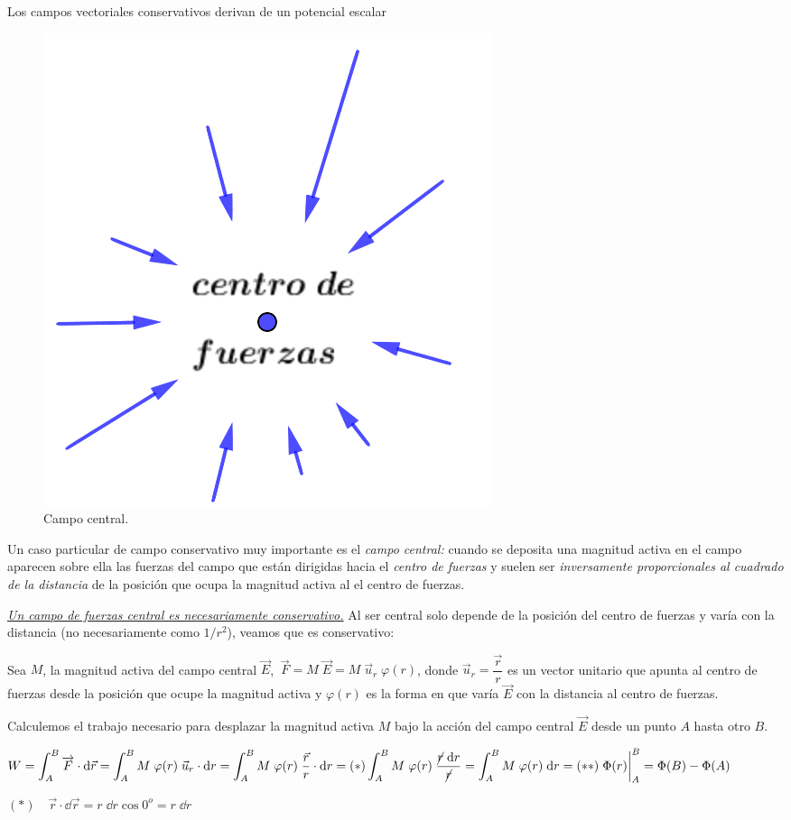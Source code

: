 \begin{small}
\begin{myexampleblock}{Los campos vectoriales conservativos derivan de un potencial escalar}
\begin{multicols}{2}
\begin{figure}[H]
		\centering
		\includegraphics[width=.25\textwidth]{imagenes/img02-12.png}
		\caption*{\footnotesize{Campo central}\normalsize{.}}
		\end{figure}
Un caso particular de campo conservativo muy importante es el \emph{campo central:} cuando se deposita una magnitud activa en el campo aparecen sobre ella las fuerzas del campo que están dirigidas hacia el \emph{centro de fuerzas} y suelen ser \emph{inversamente proporcionales al cuadrado de la distancia} de la posición que ocupa la magnitud activa al el centro de fuerzas.
\end{multicols}

\vspace{2mm} \emph{\underline{Un campo de fuerzas central es necesariamente conservativo.}} Al ser central solo depende de la posición del centro de fuerzas y varía con la distancia (no necesariamente como $1/r^2$), veamos que es conservativo:

\vspace{2mm} Sea $M$, la magnitud activa del campo central $\vec E$, $\ \vec F=M \; \vec E= M \; \vec u_r \; \varphi(r)$, donde $\vec u_r=\dfrac {\vec r}{r}$ es un vector unitario que apunta al centro de fuerzas desde la posición que ocupe la magnitud activa y $\varphi(r)$ es la forma en que varía $\vec E$ con la distancia al centro de fuerzas.

\vspace{2mm}  Calculemos el trabajo necesario para desplazar la magnitud activa $M$ bajo la acción del campo central $\vec E$ desde un punto $A$ hasta otro $B$.
 
\vspace{2mm}  $\displaystyle W=\int_A^B \overrightarrow F \cdot \dd \vec r =\int_A^B M\; \varphi(r) \;\vec u_r \cdot \dd r= \int_A^B M\; \varphi(r) \; \dfrac {\vec r}{r} \cdot \dd r =(*) \int_A^B M\; \varphi(r) \; \dfrac {\cancel{r}\;\dd r}{\cancel{r}}=\int_A^B M\; \varphi(r)\; \dd r=(**)\eval{\Phi(r)}_{A}^B=\Phi(B)-\Phi(A)$
 
 \vspace{2mm}
 \textcolor{gris}{
 $(*)\quad \vec r\cdot \dd \vec r=r\;\dd r \cos 0^o=r\; \dd r $}
 

\end{myexampleblock}
\end{small}

